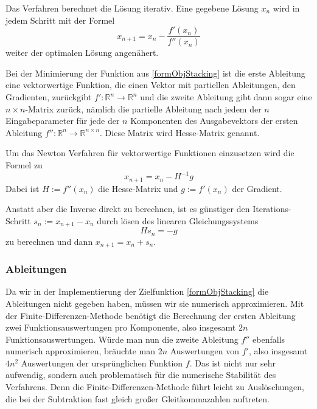 \documentclass[runningheads,a4paper]{llncs}
\begin{document}
Das Verfahren berechnet die Lösung iterativ. Eine gegebene Lösung $x_n$ wird in jedem Schritt mit der Formel
\begin{equation*}
x_{n+1} = x_n - \frac{f'(x_n)}{f''(x_n)}
\end{equation*}
weiter der optimalen Lösung angenähert.

Bei der Minimierung der Funktion aus \ref{formObjStacking} ist die erste Ableitung eine vektorwertige Funktion, die einen Vektor mit partiellen Ableitungen, den Gradienten, zurückgibt ${f': \mathbb{R}^n \rightarrow \mathbb{R}^n}$ und die zweite Ableitung gibt dann sogar eine ${n\times n}$-Matrix zurück, nämlich die partielle Ableitung nach jedem der $n$ Eingabeparameter für jede der $n$ Komponenten des Ausgabevektors der ersten Ableitung ${f'': \mathbb{R}^n \rightarrow \mathbb{R}^{n\times n}}$. Diese Matrix wird Hesse-Matrix genannt.

Um das Newton Verfahren für vektorwertige Funktionen einzusetzen wird die Formel zu
\begin{equation}
\label{eq:ndimnewtonstep}
x_{n+1} = x_n - H^{-1}g
\end{equation}
Dabei ist $H := f''(x_n)$ die Hesse-Matrix und $g := f'(x_n)$ der Gradient.

Anstatt aber die Inverse direkt zu berechnen, ist es günstiger den Iterations-Schritt ${s_n := x_{n+1} - x_n}$ durch lösen des linearen Gleichungssystems
\begin{equation}
\label{eq:newtonlineq}
Hs_n=-g
\end{equation}
zu berechnen und dann ${x_{n+1} = x_n + s_n}$.


\subsubsection{Ableitungen}

Da wir in der Implementierung der Zielfunktion \ref{formObjStacking} die Ableitungen nicht gegeben haben, müssen wir sie numerisch approximieren. Mit der Finite-Differenzen-Methode benötigt die Berechnung der ersten Ableitung zwei Funktionsauswertungen pro Komponente, also insgesamt $2n$ Funktionsauswertungen. Würde man nun die zweite Ableitung $f''$ ebenfalls numerisch approximieren, bräuchte man $2n$ Auswertungen von $f'$, also insgesamt $4n^2$ Auswertungen der ursprünglichen Funktion $f$. Das ist nicht nur sehr aufwendig, sondern auch problematisch für die numerische Stabilität des Verfahrens. Denn die Finite-Differenzen-Methode führt leicht zu Auslöschungen, die bei der Subtraktion fast gleich großer Gleitkommazahlen auftreten.
\end{document}
